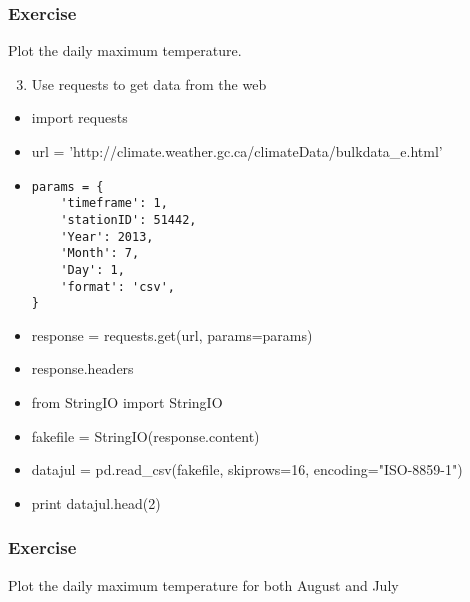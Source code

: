 \documentclass[xcolor=dvipsnames]{beamer}
\begin{document}
\begin{frame}
\frametitle{Exercise}
Plot the daily maximum temperature.
\end{frame}

\begin{frame}[fragile]
\begin{enumerate}
\setcounter{enumi}{2}
\item Use requests to get data from the web
\end{enumerate}
\begin{itemize}
\item import requests
\item url = 'http://climate.weather.gc.ca/climateData/bulkdata\_e.html'
\item 
\begin{verbatim}
params = {
    'timeframe': 1,
    'stationID': 51442,
    'Year': 2013,
    'Month': 7,
    'Day': 1,
    'format': 'csv',
}
\end{verbatim}
\item response = requests.get(url, params=params)
\item response.headers
\item from StringIO import StringIO
\item fakefile = StringIO(response.content)
\item datajul = pd.read\_csv(fakefile, skiprows=16, encoding="ISO-8859-1")
\item print datajul.head(2)
\end{itemize}
\end{frame}

\begin{frame}
\frametitle{Exercise}
Plot the daily maximum temperature for both August and July
\end{frame}
\end{document}
